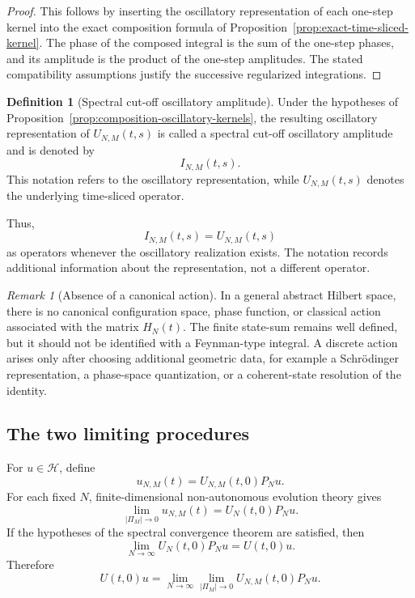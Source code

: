 \documentclass[11pt]{amsart}
\theoremstyle{plain}
\theoremstyle{definition}
\newtheorem{definition}[theorem]{Definition}
\theoremstyle{remark}
\newtheorem{remark}[theorem]{Remark}
\begin{document}
\begin{proof}
This follows by inserting the oscillatory representation of each one-step
kernel into the exact composition formula of
Proposition~\ref{prop:exact-time-sliced-kernel}. The phase of the composed
integral is the sum of the one-step phases, and its amplitude is the product
of the one-step amplitudes. The stated compatibility assumptions justify the
successive regularized integrations.
\end{proof}

\begin{definition}[Spectral cut-off oscillatory amplitude]
\label{def:spectral-cutoff-oscillatory-amplitude}
Under the hypotheses of
Proposition~\ref{prop:composition-oscillatory-kernels}, the resulting
oscillatory representation of \(U_{N,M}(t,s)\) is called a spectral cut-off
oscillatory amplitude and is denoted by
\[
I_{N,M}(t,s).
\]
This notation refers to the oscillatory representation, while
\(U_{N,M}(t,s)\) denotes the underlying time-sliced operator.
\end{definition}

Thus,
\[
I_{N,M}(t,s)=U_{N,M}(t,s)
\]
as operators whenever the oscillatory realization exists. The notation
records additional information about the representation, not a different
operator.

\begin{remark}[Absence of a canonical action]
\label{rem:no-canonical-action}
In a general abstract Hilbert space, there is no canonical configuration
space, phase function, or classical action associated with the matrix
\(H_{N}(t)\). The finite state-sum remains well defined, but it should not be
identified with a Feynman-type integral. A discrete action arises only after
choosing additional geometric data, for example a Schrödinger
representation, a phase-space quantization, or a coherent-state resolution
of the identity.
\end{remark}


\subsection{The two limiting procedures}
\label{subsec:two-limiting-procedures}

For \(u\in\mathcal{H}\), define
\[
u_{N,M}(t)
=
U_{N,M}(t,0)P_{N}u.
\]
For each fixed \(N\), finite-dimensional non-autonomous evolution theory gives
\[
\lim_{|\Pi_{M}|\to 0}
u_{N,M}(t)
=
U_{N}(t,0)P_{N}u.
\]
If the hypotheses of the spectral convergence theorem are satisfied, then
\[
\lim_{N\to\infty}
U_{N}(t,0)P_{N}u
=
U(t,0)u.
\]
Therefore
\[
U(t,0)u
=
\lim_{N\to\infty}
\lim_{|\Pi_{M}|\to 0}
U_{N,M}(t,0)P_{N}u.
\]
\end{document}
